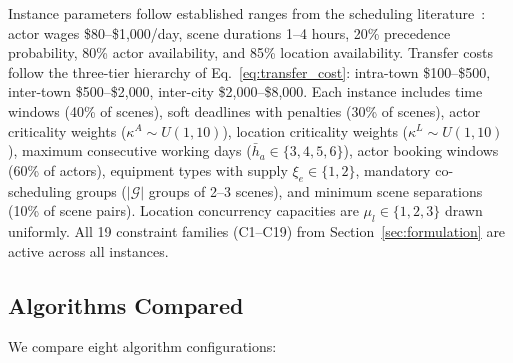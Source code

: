 Instance parameters follow established ranges from the scheduling literature~\citep{bomsdorf2008,nordstrom2022}: actor wages \$80--\$1{,}000/day, scene durations 1--4 hours, 20\% precedence probability, 80\% actor availability, and 85\% location availability.
Transfer costs follow the three-tier hierarchy of Eq.~\eqref{eq:transfer_cost}: intra-town \$100--\$500, inter-town \$500--\$2{,}000, inter-city \$2{,}000--\$8{,}000.
Each instance includes time windows (40\% of scenes), soft deadlines with penalties (30\% of scenes), actor criticality weights ($\kappa^A \sim U(1,10)$), location criticality weights ($\kappa^L \sim U(1,10)$), maximum consecutive working days ($\bar{h}_a \in \{3,4,5,6\}$), actor booking windows (60\% of actors), equipment types with supply $\xi_e \in \{1,2\}$, mandatory co-scheduling groups ($|\mathcal{G}|$ groups of 2--3 scenes), and minimum scene separations (10\% of scene pairs).
Location concurrency capacities are $\mu_l \in \{1,2,3\}$ drawn uniformly.
All 19 constraint families (C1--C19) from Section~\ref{sec:formulation} are active across all instances.

\subsection{Algorithms Compared}

We compare eight algorithm configurations:

